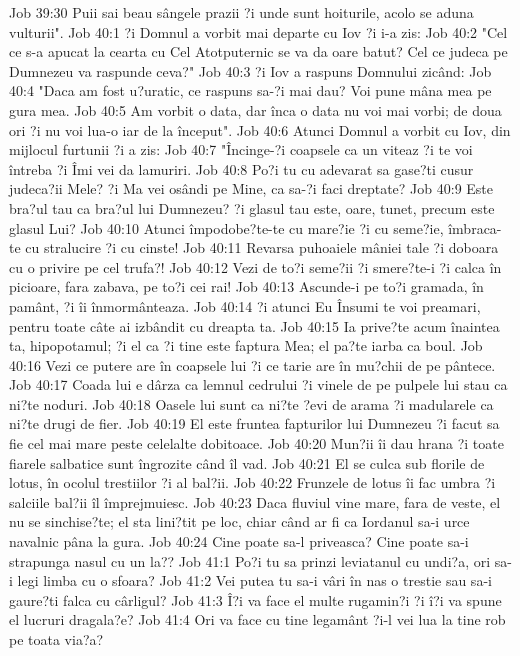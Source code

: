 Job 39:30  Puii sai beau sângele prazii ?i unde sunt hoiturile, acolo se aduna vulturii".
Job 40:1  ?i Domnul a vorbit mai departe cu Iov ?i i-a zis:
Job 40:2  "Cel ce s-a apucat la cearta cu Cel Atotputernic se va da oare batut? Cel ce judeca pe Dumnezeu va raspunde ceva?"
Job 40:3  ?i Iov a raspuns Domnului zicând:
Job 40:4  "Daca am fost u?uratic, ce raspuns sa-?i mai dau? Voi pune mâna mea pe gura mea.
Job 40:5  Am vorbit o data, dar înca o data nu voi mai vorbi; de doua ori ?i nu voi lua-o iar de la început".
Job 40:6  Atunci Domnul a vorbit cu Iov, din mijlocul furtunii ?i a zis:
Job 40:7  "Încinge-?i coapsele ca un viteaz ?i te voi întreba ?i Îmi vei da lamuriri.
Job 40:8  Po?i tu cu adevarat sa gase?ti cusur judeca?ii Mele? ?i Ma vei osândi pe Mine, ca sa-?i faci dreptate?
Job 40:9  Este bra?ul tau ca bra?ul lui Dumnezeu? ?i glasul tau este, oare, tunet, precum este glasul Lui?
Job 40:10  Atunci împodobe?te-te cu mare?ie ?i cu seme?ie, îmbraca-te cu stralucire ?i cu cinste!
Job 40:11  Revarsa puhoaiele mâniei tale ?i doboara cu o privire pe cel trufa?!
Job 40:12  Vezi de to?i seme?ii ?i smere?te-i ?i calca în picioare, fara zabava, pe to?i cei rai!
Job 40:13  Ascunde-i pe to?i gramada, în pamânt, ?i îi înmormânteaza.
Job 40:14  ?i atunci Eu Însumi te voi preamari, pentru toate câte ai izbândit cu dreapta ta.
Job 40:15  Ia prive?te acum înaintea ta, hipopotamul; ?i el ca ?i tine este faptura Mea; el pa?te iarba ca boul.
Job 40:16  Vezi ce putere are în coapsele lui ?i ce tarie are în mu?chii de pe pântece.
Job 40:17  Coada lui e dârza ca lemnul cedrului ?i vinele de pe pulpele lui stau ca ni?te noduri.
Job 40:18  Oasele lui sunt ca ni?te ?evi de arama ?i madularele ca ni?te drugi de fier.
Job 40:19  El este fruntea fapturilor lui Dumnezeu ?i facut sa fie cel mai mare peste celelalte dobitoace.
Job 40:20  Mun?ii îi dau hrana ?i toate fiarele salbatice sunt îngrozite când îl vad.
Job 40:21  El se culca sub florile de lotus, în ocolul trestiilor ?i al bal?ii.
Job 40:22  Frunzele de lotus îi fac umbra ?i salciile bal?ii îl împrejmuiesc.
Job 40:23  Daca fluviul vine mare, fara de veste, el nu se sinchise?te; el sta lini?tit pe loc, chiar când ar fi ca Iordanul sa-i urce navalnic pâna la gura.
Job 40:24  Cine poate sa-l priveasca? Cine poate sa-i strapunga nasul cu un la??
Job 41:1  Po?i tu sa prinzi leviatanul cu undi?a, ori sa-i legi limba cu o sfoara?
Job 41:2  Vei putea tu sa-i vâri în nas o trestie sau sa-i gaure?ti falca cu cârligul?
Job 41:3  Î?i va face el multe rugamin?i ?i î?i va spune el lucruri dragala?e?
Job 41:4  Ori va face cu tine legamânt ?i-l vei lua la tine rob pe toata via?a?
